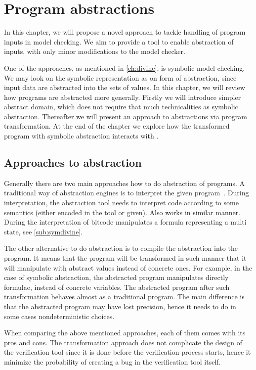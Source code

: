 \chapter{Program abstractions}\label{ch:abstraction}

In this chapter, we will propose a novel approach to tackle
handling of program inputs in model checking. We aim to provide a tool to
enable abstraction of inputs, with only minor modifications to the model checker.

One of the approaches, as mentioned in \autoref{ch:divine}, is symbolic model
checking. We may look on the symbolic representation as on form of abstraction,
since input data are abstracted into the sets of values. In this chapter, we will
review how programs are abstracted more generally. Firstly we will introduce
simpler abstract domain, which does not require that much technicalities as
symbolic abstraction. Thereafter we will present an approach to abstractions via
program transformation. At the end of the chapter we explore how the transformed
program with symbolic abstraction interacts with \DIVINE.

\section{Approaches to abstraction}

Generally there are two main approaches how to do abstraction of programs.  A
traditional way of abstraction engines is to interpret the given
program~\cite{Cousot79}. During interpretation, the abstraction tool needs to
interpret code according to some semantics (either encoded in the tool or
given). Also \SymDIVINE works in similar manner. During the interpretation of \LLVM
bitcode \SymDIVINE manipulates a formula representing a multi
state, see \autoref{sub:symdivine}.

The other alternative to do abstraction is to compile the abstraction into the
program. It means that the program will be transformed in such manner that it will
manipulate with abstract values instead of concrete ones. For example, in the
case of symbolic abstraction, the abstracted program manipulates directly
formulae, instead of concrete variables. The abstracted program after such
transformation behaves almost as a traditional program. The main difference is
that the abstracted program may have lost precision, hence it needs to do
in some cases nondeterministic choices.

When comparing the above mentioned approaches, each of them comes with its pros
and cons. The transformation approach does not complicate the design of the
verification tool since it is done before the verification process starts, hence
it minimize the probability of creating a bug in the verification tool itself.

